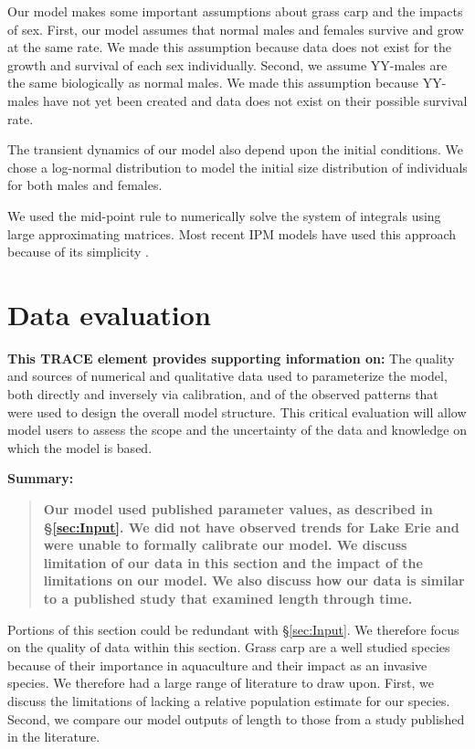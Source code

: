 \documentclass{article}[12pt]
\begin{document}
Our model makes some important assumptions about grass carp and the impacts of sex.
First, our model assumes that normal males and females survive and grow at the same rate.
We made this assumption because data does not exist for the growth and survival of each sex individually.
Second, we assume YY-males are the same biologically as normal males.
We made this assumption because YY-males have not yet been created and data does not exist on their possible survival rate.

The transient dynamics of our model also depend upon the initial conditions.
We chose a log-normal distribution to model the initial size distribution of individuals for both males and females.
 

We used the mid-point rule to numerically solve the system of integrals \citep{burden2005numerical} using large approximating matrices.
Most recent IPM models have used this approach because of its simplicity \citep{ellner2006integral, ramula2009integral, merow2014advancing}.

\stopcontents[sections]

\section{Data evaluation}\label{sec:dev}

\textbf{This TRACE element provides supporting information on:} The quality and sources of numerical and qualitative data used to parameterize the model, both directly and inversely via calibration, and of the observed patterns that were used to design the overall model structure. This critical evaluation will allow model users to assess the scope and the uncertainty of the data and knowledge on which the model is based.

\textbf{Summary:}
\begin{verse}
\textbf{
Our model used published parameter values, as described in \S \ref{sec:Input}.
We did not have observed trends for Lake Erie and were unable to formally calibrate our model.
We discuss limitation of our data in this section and the impact of the limitations on our model.
We also discuss how our data is similar to a published study that examined length through time.
}
\end{verse}

Portions of this section could be redundant with \S \ref{sec:Input}.
We therefore focus on the quality of data within this section.
Grass carp are a well studied species because of their importance in aquaculture and their impact as an invasive species.
We therefore had a large range of literature to draw upon.
First, we discuss the limitations of lacking a relative population estimate for our species.
Second, we compare our model outputs of length to those from a study published in the literature.
\end{document}
